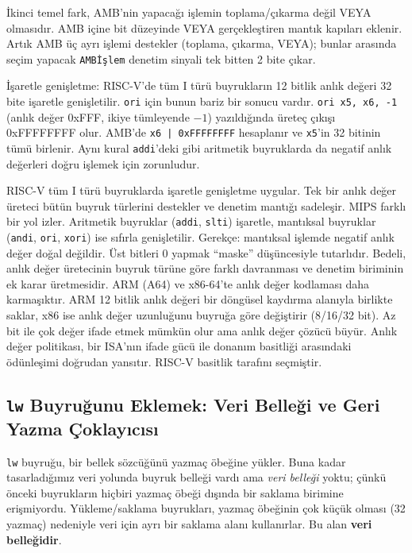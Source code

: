 İkinci temel fark, AMB'nin yapacağı işlemin toplama/çıkarma değil VEYA olmasıdır. AMB içine bit düzeyinde VEYA gerçekleştiren mantık kapıları eklenir. Artık AMB üç ayrı işlemi destekler (toplama, çıkarma, VEYA); bunlar arasında seçim yapacak \texttt{AMBİşlem} denetim sinyali tek bitten 2 bite çıkar.

İşaretle genişletme: RISC-V'de tüm I türü buyrukların 12 bitlik anlık değeri 32 bite işaretle genişletilir. \texttt{ori} için bunun bariz bir sonucu vardır. \texttt{ori x5, x6, -1} (anlık değer 0xFFF, ikiye tümleyende $-1$) yazıldığında üreteç çıkışı 0xFFFFFFFF olur. AMB'de \texttt{x6 | 0xFFFFFFFF} hesaplanır ve \texttt{x5}'in 32 bitinin tümü birlenir. Aynı kural \texttt{addi}'deki gibi aritmetik buyruklarda da negatif anlık değerleri doğru işlemek için zorunludur.

\begin{karsilastirma}
RISC-V tüm I türü buyruklarda işaretle genişletme uygular. Tek bir anlık değer üreteci bütün buyruk türlerini destekler ve denetim mantığı sadeleşir. MIPS farklı bir yol izler. Aritmetik buyruklar (\texttt{addi}, \texttt{slti}) işaretle, mantıksal buyruklar (\texttt{andi}, \texttt{ori}, \texttt{xori}) ise sıfırla genişletilir. Gerekçe: mantıksal işlemde negatif anlık değer doğal değildir. Üst bitleri 0 yapmak ``maske'' düşüncesiyle tutarlıdır. Bedeli, anlık değer üretecinin buyruk türüne göre farklı davranması ve denetim biriminin ek karar üretmesidir. ARM (A64) ve x86-64'te anlık değer kodlaması daha karmaşıktır. ARM 12 bitlik anlık değeri bir döngüsel kaydırma alanıyla birlikte saklar, x86 ise anlık değer uzunluğunu buyruğa göre değiştirir (8/16/32 bit). Az bit ile çok değer ifade etmek mümkün olur ama anlık değer çözücü büyür. Anlık değer politikası, bir ISA'nın ifade gücü ile donanım basitliği arasındaki ödünleşimi doğrudan yansıtır. RISC-V basitlik tarafını seçmiştir.
\end{karsilastirma}

\subsection{\texttt{lw} Buyruğunu Eklemek: Veri Belleği ve Geri Yazma Çoklayıcısı}
\label{subsec:vy-lw}

\texttt{lw} buyruğu, bir bellek sözcüğünü yazmaç öbeğine yükler. Buna kadar tasarladığımız veri yolunda buyruk belleği vardı ama \emph{veri belleği} yoktu; çünkü önceki buyrukların hiçbiri yazmaç öbeği dışında bir saklama birimine erişmiyordu. Yükleme/saklama buyrukları, yazmaç öbeğinin çok küçük olması (32 yazmaç) nedeniyle veri için ayrı bir saklama alanı kullanırlar. Bu alan \textbf{veri belleğidir}.

